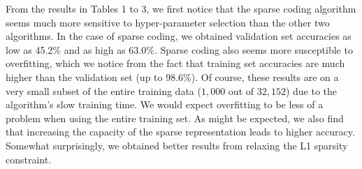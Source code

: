 \documentclass{article} %
\begin{document}
From the results in Tables 1 to 3, we first notice that the sparse coding algorithm seems much more sensitive to hyper-parameter selection than the other two algorithms. In the case of sparse coding, we obtained validation set accuracies as low as 45.2\% and as high as 63.0\%. Sparse coding also seems more susceptible to overfitting, which we notice from the fact that training set accuracies are much higher than the validation set (up to 98.6\%). Of course, these results are on a very small subset of the entire training data ($1,000$ out of $32,152$) due to the algorithm's slow training time. We would expect overfitting to be less of a problem when using the entire training set. As might be expected, we also find that increasing the capacity of the sparse representation leads to higher accuracy. Somewhat surprisingly, we obtained better results from relaxing the L1 sparsity constraint.
\end{document}
